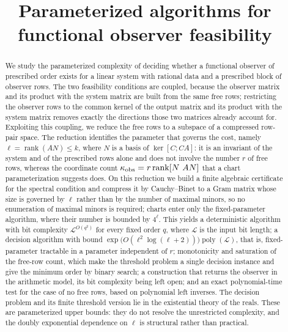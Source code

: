 \documentclass[journal]{IEEEtran}
\theoremstyle{plainn}
\theoremstyle{remark}
\begin{document}
\title{Parameterized algorithms for functional observer feasibility}
\author{}
\maketitle

\begin{abstract}
We study the parameterized complexity of deciding whether a functional observer of prescribed
order exists for a linear system with rational data and a prescribed block of observer rows. The two
feasibility conditions are coupled, because the observer matrix and its product with the system
matrix are built from the same free rows; restricting the observer rows to the common kernel of
the output matrix and its product with the system matrix removes exactly the directions those two
matrices already account for. Exploiting this coupling, we reduce the free rows to a subspace of a
compressed row-pair space. The reduction identifies the parameter that governs the cost, namely
$\ell=\operatorname{rank}(AN)\le k$, where $N$ is a basis of $\ker[C;CA]$: it is an invariant of
the system and of the prescribed rows alone and does not involve the number $r$ of free rows,
whereas the coordinate count $\kappa_{\rm obs}=r\operatorname{rank}[N\ AN]$ that a chart
parameterization suggests does. On this reduction we build a finite algebraic certificate for the
spectral condition and compress it by Cauchy--Binet to a Gram matrix whose size is governed by
$\ell$ rather than by the number of maximal minors, so no enumeration of maximal minors is required;
charts enter only the fixed-parameter algorithm, where their number is bounded by $4^{\ell}$. This yields a deterministic algorithm with bit complexity $\mathcal L^{O(q^2)}$ for
every fixed order $q$, where $\mathcal L$ is the input bit length; a decision algorithm with bound
$\exp\bigl(O(\ell^2\log(\ell+2))\bigr)\operatorname{poly}(\mathcal L)$, that is, fixed-parameter
tractable in a parameter independent of $r$; monotonicity and saturation of the free-row count,
which make the threshold problem a single decision instance and give the minimum order by binary
search; a construction that returns the observer in the arithmetic model, its bit complexity being
left open; and an exact polynomial-time test for the case of no free rows, based on polynomial left
inverses. The decision problem and its finite threshold version lie in the existential theory of
the reals. These are parameterized upper bounds: they do not resolve the unrestricted complexity,
and the doubly exponential dependence on $\ell$ is structural rather than practical.
\end{abstract}
\end{document}
